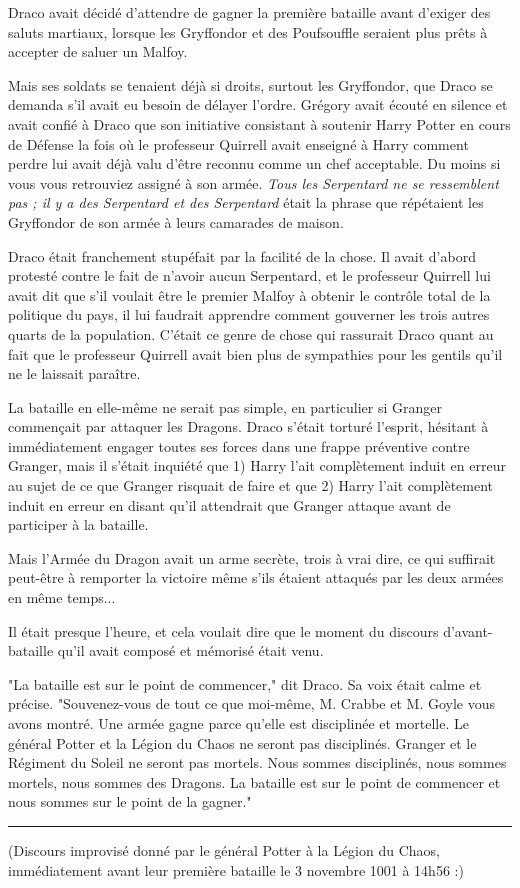 Draco avait décidé d'attendre de gagner la première bataille avant d'exiger des saluts martiaux, lorsque les Gryffondor et des Poufsouffle seraient plus prêts à accepter de saluer un Malfoy.

Mais ses soldats se tenaient déjà si droits, surtout les Gryffondor, que Draco se demanda s'il avait eu besoin de délayer l'ordre. Grégory avait écouté en silence et avait confié à Draco que son initiative consistant à soutenir Harry Potter en cours de Défense la fois où le professeur Quirrell avait enseigné à Harry comment perdre lui avait déjà valu d'être reconnu comme un chef acceptable. Du moins si vous vous retrouviez assigné à son armée. \emph{Tous les Serpentard ne se ressemblent pas ; il y a des Serpentard et des Serpentard}  était la phrase que répétaient les Gryffondor de son armée à leurs camarades de maison.

Draco était franchement stupéfait par la facilité de la chose. Il avait d'abord protesté contre le fait de n'avoir aucun Serpentard, et le professeur Quirrell lui avait dit que s'il voulait être le premier Malfoy à obtenir le contrôle total de la politique du pays, il lui faudrait apprendre comment gouverner les trois autres quarts de la population. C'était ce genre de chose qui rassurait Draco quant au fait que le professeur Quirrell avait bien plus de sympathies pour les gentils qu'il ne le laissait paraître.

La bataille en elle-même ne serait pas simple, en particulier si Granger commençait par attaquer les Dragons. Draco s'était torturé l'esprit, hésitant à immédiatement engager toutes ses forces dans une frappe préventive contre Granger, mais il s'était inquiété que 1) Harry l'ait complètement induit en erreur au sujet de ce que Granger risquait de faire et que 2) Harry l'ait complètement induit en erreur en disant qu'il attendrait que Granger attaque avant de participer à la bataille.

Mais l'Armée du Dragon avait un arme secrète, trois à vrai dire, ce qui suffirait peut-être à remporter la victoire même s'ils étaient attaqués par les deux armées en même temps...

Il était presque l'heure, et cela voulait dire que le moment du discours d'avant-bataille qu'il avait composé et mémorisé était venu.

"La bataille est sur le point de commencer," dit Draco. Sa voix était calme et précise. "Souvenez-vous de tout ce que moi-même, M. Crabbe et M. Goyle vous avons montré. Une armée gagne parce qu'elle est disciplinée et mortelle. Le général Potter et la Légion du Chaos ne seront pas disciplinés. Granger et le Régiment du Soleil ne seront pas mortels. Nous sommes disciplinés, nous sommes mortels, nous sommes des Dragons. La bataille est sur le point de commencer et nous sommes sur le point de la gagner."
\par\noindent\rule{\textwidth}{0.4pt}
(Discours improvisé donné par le général Potter à la Légion du Chaos, immédiatement avant leur première bataille le 3 novembre 1001 à 14h56 :)

